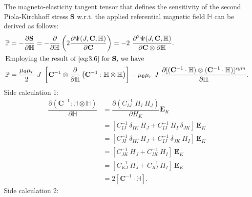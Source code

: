The magneto-elasticity tangent tensor that defines the sensitivity of the second Piola-Kirchhoff stress $\mathbf{S}$ w.r.t. the applied referential magnetic field $\mathbb{H}$ can be derived as follows:
\begin{align*}
\mathbb{P} &= -\dfrac{\partial \mathbf{S}}{\partial \mathbb{H}} = -\dfrac{\partial}{\partial \mathbb{H}} \left( 2 \dfrac{\partial \Psi (J, \mathbf{C}, \mathbb{H})}{\partial \mathbf{C}} \right) = -2 \ \dfrac{\partial^2 \Psi (J, \mathbf{C}, \mathbb{H})}{\partial \mathbf{C} \otimes \partial \mathbb{H}}.\\
\intertext{Employing the result of \Cref{eq:3.6} for $\mathbf{S}$, we have}
\mathbb{P} &= \dfrac{\mu_0 \mu_r}{2} \ J \ \left[ \mathbf{C}^{-1} \otimes \dfrac{\partial}{\partial \mathbb{H}} \left( \mathbf{C}^{-1} : \mathbb{H} \otimes \mathbb{H} \right) \right] - \mu_0 \mu_r \ J \ \dfrac{\partial [ (\mathbf{C}^{-1} \cdot \mathbb{H}) \otimes (\mathbf{C}^{-1} \cdot \mathbb{H}) ]^{sym}}{\partial \mathbb{H}}.
\end{align*}
Side calculation 1:
\begin{align*}
\dfrac{\partial \left( \mathbf{C}^{-1} : \mathbb{H} \otimes \mathbb{H} \right)}{\partial \mathbb{H}} &= \dfrac{\partial \left( C^{-1}_{IJ} \ H_I \ H_J \right)}{\partial H_K} \mathbf{E}_K \\
&= \left[ C^{-1}_{IJ} \ \delta_{IK} \ H_J + C^{-1}_{IJ} \ H_I \ \delta_{JK} \right] \ \mathbf{E}_K \\
&= \left[ C^{-1}_{JI} \ \delta_{IK} \ H_J + C^{-1}_{IJ} \ \delta_{JK} \ H_I \right] \ \mathbf{E}_K \\
&= \left[ C^{-1}_{JK} \ H_J + C^{-1}_{IK} \ H_I \right] \ \mathbf{E}_K \\
&= \left[ C^{-1}_{KJ} \ H_J + C^{-1}_{KI} \ H_I \right] \ \mathbf{E}_K \\
&= 2 [\mathbf{C}^{-1} \cdot \mathbb{H}].
\end{align*}
Side calculation 2:
